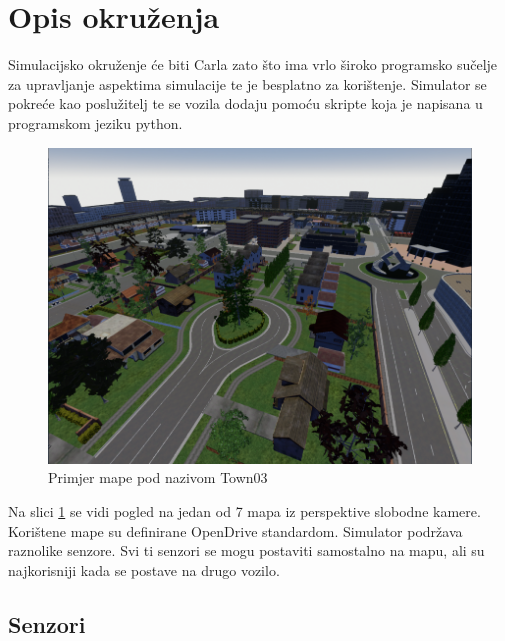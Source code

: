 \section{Opis okruženja}

Simulacijsko okruženje će biti Carla zato što ima vrlo široko programsko sučelje za upravljanje aspektima simulacije te je besplatno za korištenje. Simulator se pokreće kao poslužitelj te se vozila dodaju pomoću skripte koja je napisana u programskom jeziku python.

\begin{figure}[ht!]
  \centering
  \includegraphics[scale=0.5]{images/carla_town03_example.png}
  \caption{Primjer mape pod nazivom Town03}
  \label{fig:town03_exmaple}
\end{figure}

Na slici \ref{fig:town03_exmaple} se vidi pogled na jedan od 7 mapa iz perspektive slobodne kamere. Korištene mape su definirane OpenDrive standardom. Simulator podržava raznolike senzore. Svi ti senzori se mogu postaviti samostalno na mapu, ali su najkorisniji kada se postave na drugo vozilo.

\subsection{Senzori}
